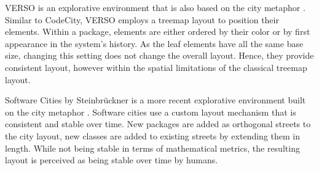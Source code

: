 VERSO is an explorative environment that is also based on the city metaphor \cite{Lang05a}. Similar to CodeCity, VERSO employs a treemap layout to position their elements. Within a package, elements are either ordered by their color or by first appearance in the system's history. As the leaf elements have all the same base size, changing this setting does not change the overall layout. Hence, they provide consistent layout, however within the spatial limitations of the classical treemap layout. 

Software Cities by Steinbr\"uckner \etal is a more recent explorative environment built on the city metaphor \cite{Stei10b}. Software cities use a custom layout mechanism that is consistent and stable over time. New packages are added as orthogonal streets to the city layout, new classes are added to existing streets by extending them in length. While not being stable in terms of mathematical metrics, the resulting layout is perceived as being stable over time by humans. 

